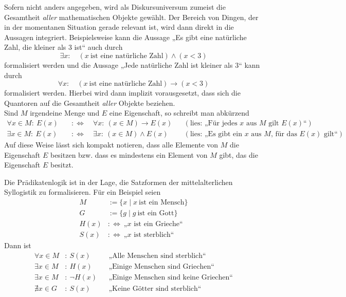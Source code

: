 \begin{bem} \label{boundedquant}
Sofern nicht anders angegeben, wird als Diskursuniversum zumeist die Gesamtheit \emph{aller} mathematischen Objekte gewählt. Der Bereich von Dingen, der in der momentanen Situation gerade relevant ist, wird dann direkt in die Aussagen integriert. Beispielsweise kann die Aussage „Es gibt eine natürliche Zahl, die kleiner als $3$ ist“ auch durch
\[ \exists x:\quad (x\ \text{ist eine natürliche Zahl}) \land (x<3) \]
formalisiert werden und die Aussage „Jede natürliche Zahl ist kleiner als $3$“ kann durch
\[ \forall x:\quad (x\ \text{ist eine natürliche Zahl}) \to (x<3) \]
formalisiert werden. Hierbei wird dann implizit vorausgesetzt, dass sich die Quantoren auf die Gesamtheit \emph{aller} Objekte beziehen. \\
Sind $M$ irgendeine Menge und $E$ eine Eigenschaft, so schreibt man abkürzend
\begin{align*}
\forall x\in M:\ E(x)\quad&:\Leftrightarrow\quad \forall x:\ (x\in M)\to E(x) && (\text{lies: „Für jedes $x$ aus $M$ gilt $E(x)$“})\\
\exists x\in M:\ E(x)\quad&:\Leftrightarrow\quad \exists x:\ (x\in M)\land E(x) &&  (\text{lies: „Es gibt ein $x$ aus $M$, für das $E(x)$ gilt“})
\end{align*}
Auf diese Weise lässt sich kompakt notieren, dass alle Elemente von $M$ die Eigenschaft $E$ besitzen bzw. dass es mindestens ein Element von $M$ gibt, das die Eigenschaft $E$ besitzt.
\end{bem}


\begin{bsp}[Syllogistik]
Die Prädikatenlogik ist in der Lage, die Satzformen der mittelalterlichen Syllogistik zu formalisieren. Für ein Beispiel seien
 \begin{align*}
  M & := \{x\mid x\ \text{ist ein Mensch} \} \\
  G & := \{g\mid g\ \text{ist ein Gott} \} \\
  H(x) & :\Leftrightarrow\ \text{„$x$ ist ein Grieche“} \\
  S(x) & :\Leftrightarrow\ \text{„$x$ ist sterblich“}
 \end{align*}
Dann ist
\begin{align*}
 \forall x\in M& :\ S(x) && \text{„Alle Menschen sind sterblich“} \\
 \exists x\in M& :\ H(x)&& \text{„Einige Menschen sind Griechen“} \\
 \exists x\in M& :\ \neg H(x) && \text{„Einige Menschen sind keine Griechen“} \\
 \nexists x\in G& :\ S(x)&& \text{„Keine Götter sind sterblich“}
\end{align*}
\end{bsp}



